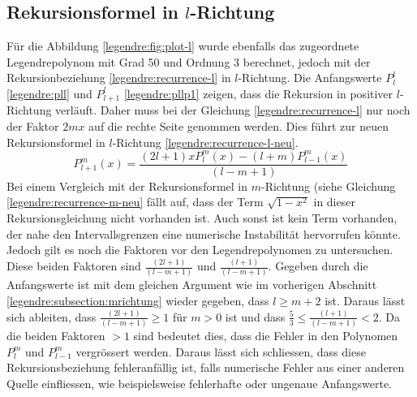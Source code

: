 \subsection{Rekursionsformel in $l$-Richtung
\label{legendre:subsection:lrichtung}}
Für die Abbildung \ref{legendre:fig:plot-l} wurde ebenfalls das zugeordnete Legendrepolynom mit Grad 50 und Ordnung 3 berechnet, jedoch mit der Rekursionbeziehung \eqref{legendre:recurrence-l} in $l$-Richtung.
Die Anfangswerte $P^{l}_{l}$ \eqref{legendre:pll} und $P^{l}_{l+1}$ \eqref{legendre:pllp1} zeigen, dass die Rekursion in positiver $l$-Richtung verläuft.
Daher muss bei der Gleichung \eqref{legendre:recurrence-l} nur noch der Faktor $2mx$ auf die rechte Seite genommen werden.
Dies führt zur neuen Rekursionsformel in $l$-Richtung \eqref{legendre:recurrence-l-neu}.
\begin{equation}
P^{m}_{l+1}(x)
= \frac{(2l+1)xP^{m}_{l}(x)-(l+m)P^{m}_{l-1}(x)}{(l-m+1)} 
\label{legendre:recurrence-l-neu}
\end{equation}
Bei einem Vergleich mit der Rekursionsformel in $m$-Richtung (siehe Gleichung \eqref{legendre:recurrence-m-neu} fällt auf, dass der Term $\sqrt{1-x^2}$ in dieser Rekursionsgleichung nicht vorhanden ist.
Auch sonst ist kein Term vorhanden, der nahe den Intervallsgrenzen eine numerische Instabilität hervorrufen könnte.
Jedoch gilt es noch die Faktoren vor den Legendrepolynomen zu untersuchen.
Diese beiden Faktoren sind $\frac{(2l+1)}{(l-m+1)}$ und $\frac{(l+1)}{(l-m+1)}$.
Gegeben durch die Anfangswerte ist mit dem gleichen Argument wie im vorherigen Abschnitt \ref{legendre:subsection:mrichtung} wieder gegeben, dass $l\geq m+2$ ist.
Daraus lässt sich ableiten, dass $\frac{(2l+1)}{(l-m+1)}\geq 1$ für $m>0$ ist und dass $\frac{5}{3}\leq \frac{(l+1)}{(l-m+1)}<2$.
Da die beiden Faktoren $>1$ sind bedeutet dies, dass die Fehler in den Polynomen $P^{m}_{l}$ und $P^{m}_{l-1}$ vergrössert werden.
Daraus lässt sich schliessen, dass diese Rekursionsbeziehung fehleranfällig ist, falls numerische Fehler aus einer anderen Quelle einfliessen, wie beispielsweise fehlerhafte oder ungenaue Anfangswerte.

